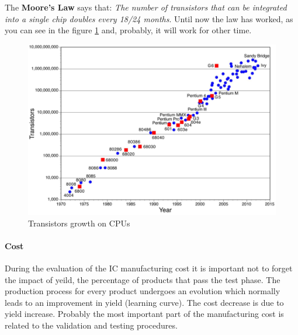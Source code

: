 \documentclass[12pt]{article}
\begin{document}
The \textbf{Moore's Law} says that: \textit{The number of transistors that can be integrated into a single chip doubles every 18/24 months}. Until now the law has worked, as you can see in the figure \ref{fig:moore} and, probably, it will work for other time.

\begin{figure}[h!]
  \centering
  \includegraphics[width=\linewidth]{images/moore.png}
  \caption{Transistors growth on CPUs}
  \label{fig:moore}
\end{figure}

\paragraph{Cost} During the evaluation of the IC manufacturing cost it is important not to forget the impact of yeild, the percentage of products that pass the test phase. The production process for every product undergoes an evolution which normally leads to an improvement in yield (learning curve). The cost decrease is due to yield increase. Probably the most important part of the manufacturing cost is related to the validation and testing procedures.\\
\end{document}
